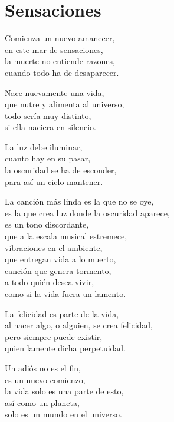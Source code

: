 \section*{Sensaciones}
\label{Sensaciones}

\vspace{1em}
\begin{center}
Comienza un nuevo amanecer,\\
en este mar de sensaciones,\\
la muerte no entiende razones,\\
cuando todo ha de desaparecer.

\vspace{1em}
Nace nuevamente una vida,\\
que nutre y alimenta al universo,\\
todo sería muy distinto,\\
si ella naciera en silencio.

\vspace{1em}
La luz debe iluminar,\\
cuanto hay en su pasar,\\
la oscuridad se ha de esconder,\\
para así un ciclo mantener.

\vspace{1em}
La canción más linda es la que no se oye,\\
es la que crea luz donde la oscuridad aparece,\\
es un tono discordante,\\
que a la escala musical estremece,\\
vibraciones en el ambiente,\\
que entregan vida a lo muerto,\\
canción que genera tormento,\\
a todo quién desea vivir,\\
como si la vida fuera un lamento.

\vspace{1em}
La felicidad es parte de la vida,\\
al nacer algo, o alguien, se crea felicidad,\\
pero siempre puede existir,\\
quien lamente dicha perpetuidad.

\vspace{4em}
Un adiós no es el fin,\\
es un nuevo comienzo,\\
la vida solo es una parte de esto,\\
así como un planeta,\\
solo es un mundo en el universo.


\end{center}




